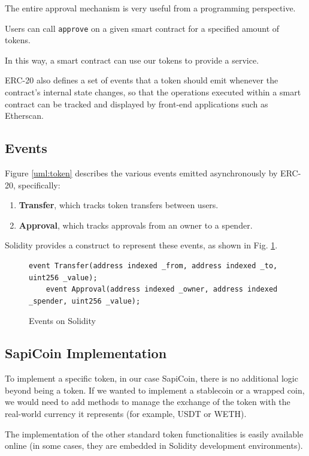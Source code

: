 \documentclass[conference]{IEEEtran}
\begin{document}
The entire approval mechanism is very useful from a programming perspective.

Users can call \texttt{approve} on a given smart contract for a specified amount of tokens.

In this way, a smart contract can use our tokens to provide a service.

ERC-20 also defines a set of events that a token should emit whenever the contract’s internal state changes, so that the operations executed within a smart contract can be tracked and displayed by front-end applications such as Etherscan.

\subsection{Events}

Figure \ref{uml:token} describes the various events emitted asynchronously by ERC-20, specifically:

\begin{enumerate}
\item \textbf{Transfer}, which tracks token transfers between users.
\item \textbf{Approval}, which tracks approvals from an owner to a spender.
\end{enumerate}

Solidity provides a construct to represent these events, as shown in Fig. \ref{code:events}.
\begin{figure}
\centering
\begin{lstlisting}[style=soliditystyle]
    event Transfer(address indexed _from, address indexed _to, uint256 _value);
    event Approval(address indexed _owner, address indexed _spender, uint256 _value);
\end{lstlisting}
\caption{Events on Solidity} 
\label{code:events}
\end{figure}

\subsection{SapiCoin Implementation}

To implement a specific token, in our case SapiCoin, there is no additional logic beyond being a token. If we wanted to implement a stablecoin or a wrapped coin, we would need to add methods to manage the exchange of the token with the real-world currency it represents (for example, USDT or WETH).

The implementation of the other standard token functionalities is easily available online (in some cases, they are embedded in Solidity development environments).
\end{document}

